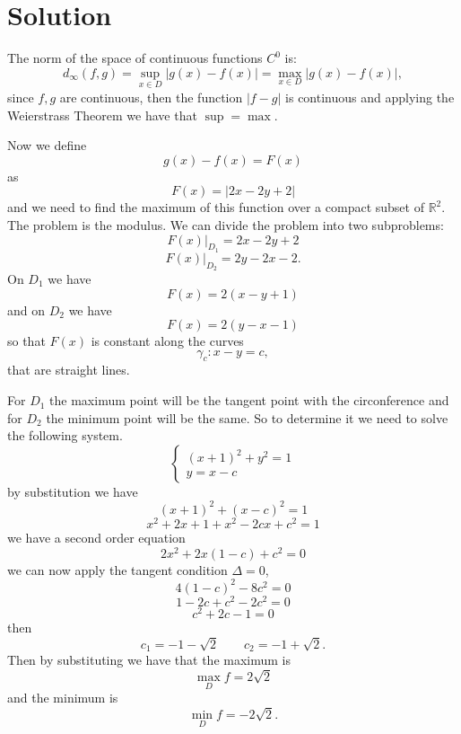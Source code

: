 \documentclass[a4paper, twoside, openany]{book}
\newcommand{\R}{\mathbb{R}}
\begin{document}
\section*{Solution}
The norm of the space of continuous functions $C^0$ is:
$$d_{\infty}(f, g) = \sup_{x \in D} |g(x) - f(x)| = \max_{x \in D} |g(x) - f(x)|,$$
since $f, g$ are continuous, then the function $|f - g|$ is continuous and applying the Weierstrass Theorem we have that $\sup = \max$. \par 
Now we define
$$g(x) - f(x) = F(x)$$
as
$$F(x) = |2x - 2y + 2|$$
and we need to  find the maximum of this function over a compact subset of $\R^2$. The problem is the modulus. We can divide the problem into two subproblems:
$$F(x)|_{D_1} = 2x - 2y + 2$$
$$F(x)|_{D_2} = 2y - 2x - 2.$$
On $D_1$ we have
$$F(x) = 2(x - y + 1)$$
and on $D_2$ we have
$$F(x) = 2(y - x - 1)$$
so that $F(x)$ is constant along the curves
$$\gamma_c : x - y = c,$$
that are straight lines.
\begin{figure}[!ht]
\begin{center}
\end{center}
\end{figure} 
For $D_1$ the maximum point will be the tangent point with the circonference and for $D_2$ the minimum point will be the same. So to determine it we need to solve the following system.
$$\begin{cases}
(x + 1)^2 + y^2 = 1 \\
y = x - c
\end{cases}$$
by substitution we have
$$(x + 1)^2 + (x - c)^2 = 1$$
$$x^2 + 2x + 1 + x^2 - 2c x + c^2 = 1$$
we have a second order equation
$$2x^2 + 2x(1 - c) + c^2 = 0$$
we can now apply the tangent condition $\Delta = 0$,
$$4(1 - c)^2 - 8 c^2 = 0$$
$$1 - 2c + c^2 - 2c^2 = 0$$
$$c^2 + 2c - 1 = 0$$
then
$$c_1 = -1 - \sqrt{2} \qquad c_2 = -1 + \sqrt{2}.$$
Then by substituting we have that the maximum is
$$\max_{D} f = 2 \sqrt{2}$$
and the minimum is 
$$\min_{D} f = - 2 \sqrt{2}.$$
\clearpage
\end{document}
